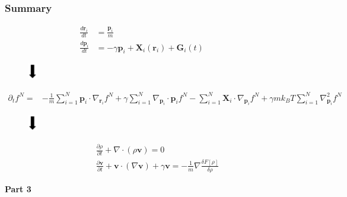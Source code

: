 \documentclass[aspectratio=169,xcolor=dvipsnames]{beamer}
\begin{document}
\begin{frame}
	\frametitle{Summary}
	\begin{align*}
	\frac{d \mathbf{r}_i}{dt} &= \frac{\mathbf{p}_i}{m}\\
	\frac{d \mathbf{p}_i}{dt} &= - \gamma \mathbf{p}_i + \mathbf{X}_i(\mathbf{r}_i) + \mathbf{G}_i(t) \qquad \quad
	\end{align*}
		\vspace{-0.2cm}
	\begin{figure}
		\includegraphics[width=0.4cm]{Arrow4.png}
	\end{figure}
	\vspace{-0.3cm}
	\begin{align*}
	\partial_t f^N = &- \frac{1}{m} \sum_{i=1}^N \mathbf{p}_i \cdot \nabla_{\mathbf{r}_i} f^N + \gamma \sum_{i = 1}^N \nabla_{\mathbf{p}_i}
	\cdot \mathbf{p}_i f^N - \sum_{i=1}^N \mathbf{X}_i \cdot \nabla_{\mathbf{p}_i}f^N + \gamma m k_BT \sum_{i=1}^N \nabla^2_{\mathbf{p}_i}f^N	
	\end{align*}
	\vspace{-0.2cm}
	\begin{figure}
		\includegraphics[width=0.4cm]{Arrow4.png}
	\end{figure}
	\vspace{-0.3cm}
	\begin{align*}
	&\frac{\partial \rho}{\partial t} + \nabla \cdot \left(\rho \mathbf{v}\right) = 0 \\
	&\frac{\partial \mathbf{v}}{\partial t} + \mathbf{v} \cdot \left(\nabla \mathbf{v}\right) + \gamma \mathbf{v} = - \frac{1}{m} \nabla \frac{\delta {F}[\rho]}{\delta \rho}
	\end{align*}
\end{frame}
\begin{frame}
	\centering
	\textbf{ \huge Part 3}
\end{frame}
\end{document}
